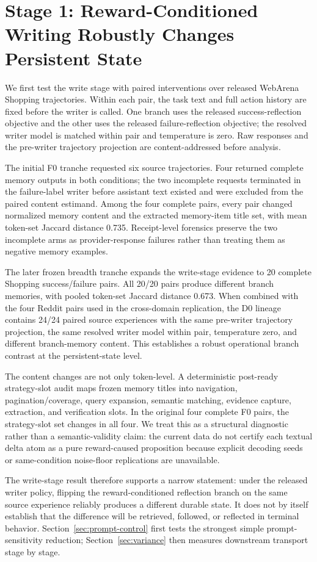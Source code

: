 \section{Stage 1: Reward-Conditioned Writing Robustly Changes Persistent State}
\label{sec:f0}
We first test the write stage with paired interventions over released WebArena Shopping trajectories. Within each pair, the task text and full action history are fixed before the writer is called. One branch uses the released success-reflection objective and the other uses the released failure-reflection objective; the resolved writer model is matched within pair and temperature is zero. Raw responses and the pre-writer trajectory projection are content-addressed before analysis.

The initial F0 tranche requested six source trajectories. Four returned complete memory outputs in both conditions; the two incomplete requests terminated in the failure-label writer before assistant text existed and were excluded from the paired content estimand. Among the four complete pairs, every pair changed normalized memory content and the extracted memory-item title set, with mean token-set Jaccard distance 0.735. Receipt-level forensics preserve the two incomplete arms as provider-response failures rather than treating them as negative memory examples.

The later frozen breadth tranche expands the write-stage evidence to 20 complete Shopping success/failure pairs. All 20/20 pairs produce different branch memories, with pooled token-set Jaccard distance 0.673. When combined with the four Reddit pairs used in the cross-domain replication, the D0 lineage contains 24/24 paired source experiences with the same pre-writer trajectory projection, the same resolved writer model within pair, temperature zero, and different branch-memory content. This establishes a robust operational branch contrast at the persistent-state level.

The content changes are not only token-level. A deterministic post-ready strategy-slot audit maps frozen memory titles into navigation, pagination/coverage, query expansion, semantic matching, evidence capture, extraction, and verification slots. In the original four complete F0 pairs, the strategy-slot set changes in all four. We treat this as a structural diagnostic rather than a semantic-validity claim: the current data do not certify each textual delta atom as a pure reward-caused proposition because explicit decoding seeds or same-condition noise-floor replications are unavailable.

The write-stage result therefore supports a narrow statement: under the released writer policy, flipping the reward-conditioned reflection branch on the same source experience reliably produces a different durable state. It does not by itself establish that the difference will be retrieved, followed, or reflected in terminal behavior. Section~\ref{sec:prompt-control} first tests the strongest simple prompt-sensitivity reduction; Section~\ref{sec:variance} then measures downstream transport stage by stage.

